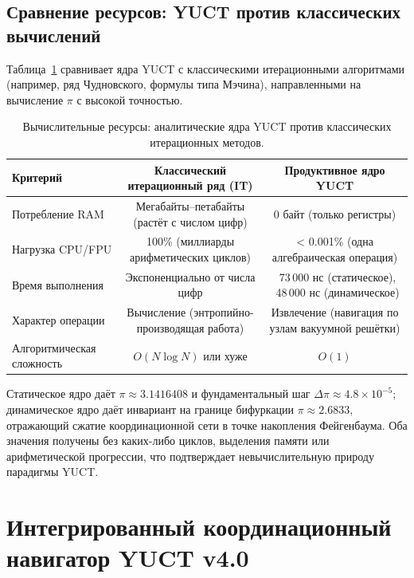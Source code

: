 \documentclass[12pt,a4paper]{article}
\begin{document}
	\subsection{Сравнение ресурсов: YUCT против классических вычислений}
	Таблица~\ref{tab:resource} сравнивает ядра YUCT с классическими итерационными алгоритмами (например, ряд Чудновского, формулы типа Мэчина), направленными на вычисление $\pi$ с высокой точностью.
	
	\begin{table}[H]
		\centering
		\scriptsize
		\caption{Вычислительные ресурсы: аналитические ядра YUCT против классических итерационных методов.}
		\label{tab:resource}
		\begin{tabular}{@{}lcc@{}}
			\toprule
			\textbf{Критерий} & \textbf{Классический итерационный ряд (IT)} & \textbf{Продуктивное ядро YUCT} \\
			\midrule
			Потребление RAM & Мегабайты–петабайты (растёт с числом цифр) & 0 байт (только регистры) \\
			Нагрузка CPU/FPU & 100\% (миллиарды арифметических циклов) & < 0.001\% (одна алгебраическая операция) \\
			Время выполнения & Экспоненциально от числа цифр & ~73\,000 нс (статическое), ~48\,000 нс (динамическое) \\
			Характер операции & Вычисление (энтропийно-производящая работа) & Извлечение (навигация по узлам вакуумной решётки) \\
			Алгоритмическая сложность & $O(N\log N)$ или хуже & $O(1)$ \\
			\bottomrule
		\end{tabular}
	\end{table}
	
	Статическое ядро даёт $\pi \approx 3.1416408$ и фундаментальный шаг $\Delta\pi\approx 4.8\times10^{-5}$; динамическое ядро даёт инвариант на границе бифуркации $\pi \approx 2.6833$, отражающий сжатие координационной сети в точке накопления Фейгенбаума. Оба значения получены без каких-либо циклов, выделения памяти или арифметической прогрессии, что подтверждает невычислительную природу парадигмы YUCT.
	
	\section{Интегрированный координационный навигатор YUCT v4.0}
	\label{sec:full-engine}
	
\end{document}
